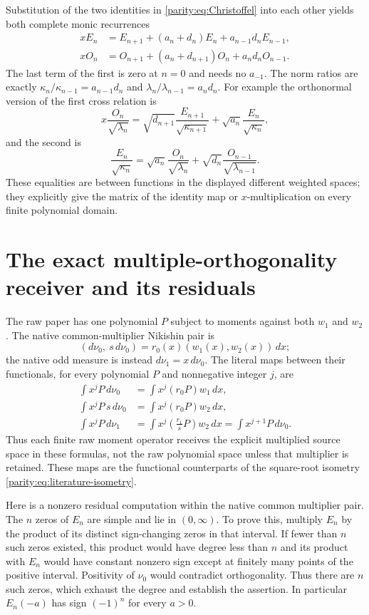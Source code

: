 Substitution of the two identities in \eqref{parity:eq:Christoffel} into
each other yields both complete monic recurrences
\begin{align}
 xE_n&=E_{n+1}+(a_n+d_n)E_n+a_{n-1}d_nE_{n-1},\label{parity:eq:E-rec}\\
 xO_n&=O_{n+1}+(a_n+d_{n+1})O_n+a_nd_nO_{n-1}.\label{parity:eq:O-rec}
\end{align}
The last term of the first is zero at $n=0$ and needs no $a_{-1}$.
The norm ratios are exactly
$\kappa_n/\kappa_{n-1}=a_{n-1}d_n$ and
$\lambda_n/\lambda_{n-1}=a_nd_n$.
For example the orthonormal version of the first cross relation is
\[
 x\frac{O_n}{\sqrt{\lambda_n}}
  =\sqrt{d_{n+1}}\frac{E_{n+1}}{\sqrt{\kappa_{n+1}}}
       +\sqrt{a_n}\frac{E_n}{\sqrt{\kappa_n}},
\]
and the second is
\[
 \frac{E_n}{\sqrt{\kappa_n}}
 =\sqrt{a_n}\frac{O_n}{\sqrt{\lambda_n}}
       +\sqrt{d_n}\frac{O_{n-1}}{\sqrt{\lambda_{n-1}}}.
\]
These equalities are between functions in the displayed different
weighted spaces; they explicitly give the matrix of the identity
map or $x$-multiplication on every finite polynomial domain.

\section{The exact multiple-orthogonality receiver and its residuals}

The raw paper has one polynomial $P$ subject to moments against
both $w_1$ and $w_2$. The native common-multiplier Nikishin pair is
\[
 (d\nu_0,\ s\,d\nu_0)=r_0(x)(w_1(x),w_2(x))\,dx;
\]
the native odd measure is instead $d\nu_1=x\,d\nu_0$.
The literal maps between their functionals, for every polynomial
$P$ and nonnegative integer $j$, are
\begin{align}
 \int x^jP\,d\nu_0&=\int x^j(r_0P)w_1\,dx,\label{parity:eq:functional0}\\
 \int x^jP\,s\,d\nu_0&=\int x^j(r_0P)w_2\,dx,\label{parity:eq:functionalS}\\
 \int x^jP\,d\nu_1&=\int x^j\left(\frac{r_1}{s}P\right)w_2\,dx
                    =\int x^{j+1}P\,d\nu_0.\label{parity:eq:functional1}
\end{align}
Thus each finite raw moment operator receives the explicit
multiplied source space in these formulas, not the raw polynomial
space unless that multiplier is retained. These maps are the
functional counterparts of the square-root isometry
\eqref{parity:eq:literature-isometry}.

Here is a nonzero residual computation within the native common
multiplier pair. The $n$ zeros of $E_n$ are simple and lie in
$(0,\infty)$. To prove this, multiply $E_n$ by the product of its
distinct sign-changing zeros in that interval. If fewer than $n$
such zeros existed, this product would have degree less than $n$
and its product with $E_n$ would have constant nonzero sign except
at finitely many points of the positive interval. Positivity of
$\nu_0$ would contradict orthogonality. Thus there are $n$ such
zeros, which exhaust the degree and establish the assertion.
In particular $E_n(-a)$ has sign $(-1)^n$ for every $a>0$.

